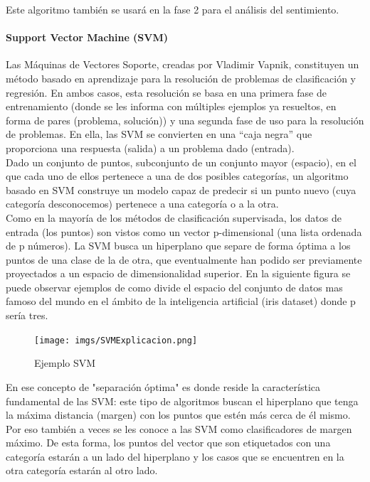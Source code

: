 \documentclass[../all.tex]{subfiles}
\begin{document}
        	Este algoritmo también se usará en la fase 2 para el análisis del sentimiento.
            
        \newpage
	    \paragraph{Support Vector Machine (SVM)}
	    
		    Las Máquinas de Vectores Soporte, creadas por Vladimir Vapnik, constituyen un método basado en aprendizaje para la resolución de problemas de clasificación y regresión. En ambos casos, esta resolución se basa en una primera fase de entrenamiento (donde se les informa con múltiples ejemplos ya resueltos, en forma de pares (problema, solución)) y una segunda fase de uso para la resolución de problemas. En ella, las SVM se convierten en una “caja negra” que proporciona una respuesta (salida) a un problema dado (entrada).\\
		    
		    Dado un conjunto de puntos, subconjunto de un conjunto mayor (espacio), en el que cada uno de ellos pertenece a una de dos posibles categorías, un algoritmo basado en SVM construye un modelo capaz de predecir si un punto nuevo (cuya categoría desconocemos) pertenece a una categoría o a la otra.\\
		    
		    Como en la mayoría de los métodos de clasificación supervisada, los datos de entrada (los puntos) son vistos como un vector p-dimensional (una lista ordenada de p números). La SVM busca un hiperplano que separe de forma óptima a los puntos de una clase de la de otra, que eventualmente han podido ser previamente proyectados a un espacio de dimensionalidad superior. En la siguiente figura se puede observar ejemplos de como divide el espacio del conjunto de datos mas famoso del mundo en el ámbito de la inteligencia artificial (iris dataset) donde p sería tres. \\
		    
		    \begin{figure}[H]
		    	\centering
		    	\texttt{[image: imgs/SVMExplicacion.png]}
		    	\caption{Ejemplo SVM\cite{svmexplicacion}}
		    \end{figure}
		    
		    En ese concepto de "separación óptima" es donde reside la característica fundamental de las SVM: este tipo de algoritmos buscan el hiperplano que tenga la máxima distancia (margen) con los puntos que estén más cerca de él mismo. Por eso también a veces se les conoce a las SVM como clasificadores de margen máximo. De esta forma, los puntos del vector que son etiquetados con una categoría estarán a un lado del hiperplano y los casos que se encuentren en la otra categoría estarán al otro lado.
        
\end{document}
